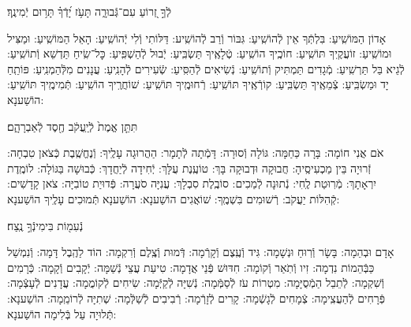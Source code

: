 \documentclass[twoside, openany, parskip=half, 11pt]{book}
\begin{document}
לְֿךָ֣ זְ֭רוֹעַ עִם־גְּֿבוּרָ֑ה תָּעֹ֥ז יָ֝דְֿךָ֗ תָּר֥וּם יְֿמִינֶֽךָ׃



אָדוֹן הַמּוֹשִֽׁיעַ: בִּלְתְּֿךָ אֵין לְֿהוֹשִֽׁיעַ: גִּבּוֹר וְֿרַב לְֿהוֹשִֽׁיע: דַּלּוֹתִי וְֿלִי יְֿהוֹשִֽׁיעַ: הָאֵל הַמּוֹשִֽׁיעַ: וּמַצִּיל וּמוֹשִֽׁיעַ: זוֹעֲקֶֽיךָ תּוֹשִֽׁיעַ: חוֹכֶֽיךָ הוֹשִֽׁיעַ: טְֿלָאֶֽיךָ תַּשְׂבִּֽיעַ: יְֿבוּל לְֿהַשְׁפִּֽיעַ: כׇּל־שִֽׂיחַ תַּדְשֵׁא וְֿתוֹשִֽׁיעַ: לְֿגֵיא בַּל תַּרְשִֽׁיעַ: מְֿגָדִים תַּמְתִּיק וְֿתוֹשִֽׁיעַ: נְֿשִׂיאִים לְֿהַסִּֽיעַ: שְֿׂעִירִים לְֿהָנִֽיעַ: עֲנָנִים מִלְּֿהַמְנִֽיעַ: פּוֹתֵֽחַ יָד וּמַשְׂבִּֽיעַ: צְֿמֵאֶֽיךָ תַּשְׂבִּֽיעַ: קוֹרְֿאֶֽיךָ תּוֹשִֽׁיעַ: רְֿחוּמֶֽיךָ תּוֹשִֽׁיעַ:
שׁוֹחֲרֶֽיךָ הוֹשִֽׁיעַ:
תְּֿמִימֶֽיךָ תּוֹשִֽׁיעַ: הוֹשַׁענָא:

תִּתֵּ֤ן אֱמֶת֙ לְֿיַֽעֲקֹ֔ב חֶ֖סֶד לְֿאַבְרָהָ֑ם׃


אֹם אֲנִי חוֹמָה: בָּרָה כַּחַמָּה: גּוֹלָה וְֿסוּרָה: דָּמְֿתָה לְֿתָמָר: הַהֲרוּגָה עָלֶֽיךָ: וְֿנֶחֱשֶֽׁבֶת כְּֿצֹאן טִבְחָה: זְֿרוּיָה בֵּין מַכְעִיסֶֽיהָ: חֲבוּקָה וּדְבוּקָה בָּךְ: טוֹעֶֽנֶת עֻלָּךְ: יְֿחִידָה לְֿיַחֲדָךְ: כְּֿבוּשָׁה בַּגּוֹלָה: לוֹמֶֽדֶת יִרְאָתָךְ: מְֿרֽוּטַת לֶֽחִי: נְֿתוּנָה לְֿמַכִים: סוֹבֶֽלֶת סִבְלָךְ: עֲנִיָּה סֹעֲרָה: פְּֿדוּיַת טוֹבִיָּה: צֹאן קָדָשִׁים: קְֿהִלּוֹת יַעֲקֹב: רְֿשׁוּמִים בִּשְׁמֶֽךָ: שׁוֹאֲגִים הוֹשַׁענָא: הוֹשַׁענָא תְּֿמוּכִים עָלֶֽיךָ הוֹשַׁענָא:

נְֿעִמ֖וֹת בִּימִינְֿךָ֣ נֶֽצַח׃


אָדָם וּבְהֵמָה: בָּשָׂר וְֿרֽוּחַ וּנְשָׁמָה: גִּיד וְֿעֶֽצֶם וְֿקָרְֿמָה: דְּֿמוּת וְֿצֶֽלֶם וְֿרִקְמָה: הוֹד לַהֶֽבֶל דָּמָה: וְֿנִמְשַׁל כַּבְּֿהֵמוֹת נִדְמָה: זִיו וְֿתֹֽאַר וְֿקוֹמָה: חִדּוּשׁ פְּֿנֵי אֲדָמָה: טִיעַת עֲצֵי נְֿשַׁמָּה: יְֿקָבִים וְֿקָמָה: כְּֿרָמִים וְֿשִׁקְמָה: לְֿתֵבֵל הַמְֿסֻיָּמָה: מִטְרוֹת עֹז לְֿסַמְּֿמָה: נְֿשִׁיָּה לְֿקַיְּֿמָה: שִׂיחִים לְֿקוֹמֲמָה: עֲדָנִים לְֿעָצְֿמָה: פְּֿרָחִים לְֿהַעֲצִֽימָה: צְֿמָחִים לְֿגָשְֿׁמָה: קָרִים לְֿזָרְֿמָה: רְֿבִיבִים לְֿשַׁלְּֿמָה:
שְׁתִיָּה לְֿרוֹמֵֽמָה: הוֹשַׁענָא:
תְּֿלוּיָה עַל בְּֿלִימָה הוֹשַׁענָא:
\end{document}
